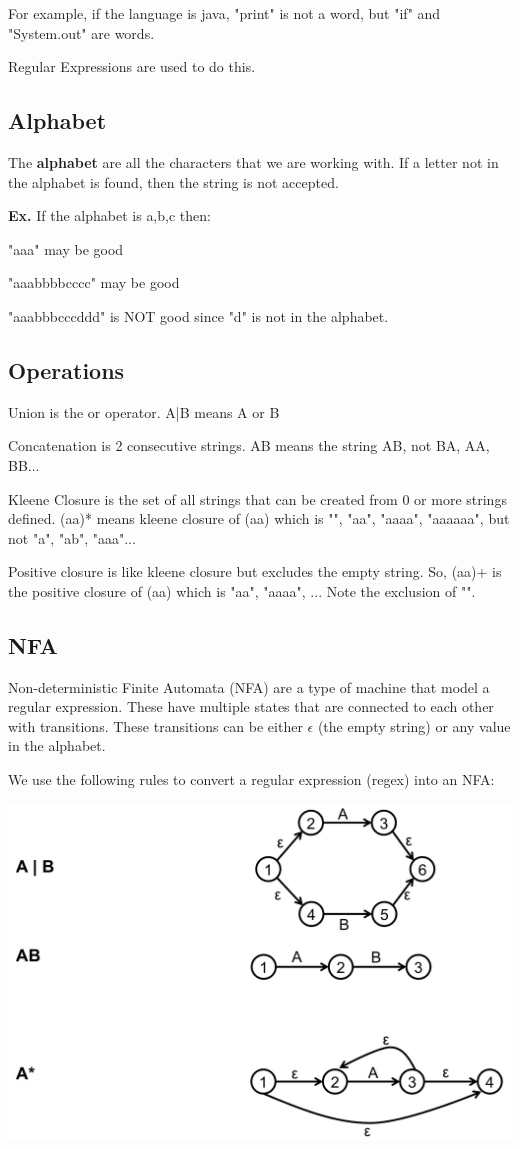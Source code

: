 \documentclass[12pt,letterpaper]{article} \usepackage{amsmath} \usepackage{graphicx} \usepackage[margin=1in]{geometry} \usepackage{longtable}  \usepackage{amssymb}
\begin{document}
	For example, if the language is java, "print" is not a word, but "if" and "System.out" are words. 
	
	Regular Expressions are used to do this. 
	
	\subsection{Alphabet}
	The \textbf{alphabet} are all the characters that we are working with. If a letter not in the alphabet is found, then the string is not accepted. 
	
	\begin{mdframed}
		\textbf{Ex. } If the alphabet is {a,b,c} then:
		
		"aaa" may be good
		
		"aaabbbbcccc" may be good
		
		"aaabbbcccddd" is NOT good since "d" is not in the alphabet. 
		
	\end{mdframed}

	\subsection{Operations}
	Union is the or operator. A|B means A or B
	
	Concatenation is 2 consecutive strings. AB means the string AB, not BA, AA, BB...
	
	Kleene Closure is the set of all strings that can be created from 0 or more strings defined. (aa)* means kleene closure of (aa) which is "", "aa", "aaaa", "aaaaaa", but not "a", "ab", "aaa"...
	
	Positive closure is like kleene closure but excludes the empty string. So, (aa)+ is the positive closure of (aa) which is "aa", "aaaa", ... Note the exclusion of "".
	
	\subsection{NFA}
	Non-deterministic Finite Automata (NFA) are a type of machine that model a regular expression. These have multiple states that are connected to each other with transitions. These transitions can be either $\epsilon$ (the empty string) or any value in the alphabet. 
	
	We use the following rules to convert a regular expression (regex) into an NFA:
	\begin{center}
		\includegraphics[width=0.7\linewidth]{nfa-rules}
	\end{center}
\end{document}
